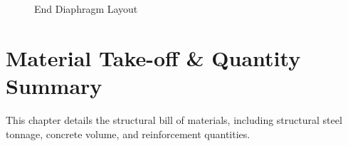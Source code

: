 \documentclass[12pt,a4paper]{report}
\numberwithin{table}{chapter}
\numberwithin{figure}{chapter}
\begin{document}
\begin{figure}[H]
\centering
{}
\caption{End Diaphragm Layout}
\label{fig:ed-layout}
\end{figure}


\noindent
\begin{minipage}[t]{0.31\textwidth}
\centering
{}
\label{fig:ed-bracing-sec}
\end{minipage}
\hfill
\begin{minipage}[t]{0.31\textwidth}
\centering
{}
\label{fig:ed-top-chord}
\end{minipage}
\hfill
\begin{minipage}[t]{0.31\textwidth}
\centering
{}
\label{fig:ed-bottom-chord}
\end{minipage}



\chapter{Material Take-off \& Quantity Summary}
\label{ch:material-takeoff}

This chapter details the structural bill of materials, including structural steel tonnage, concrete volume, and reinforcement quantities.
\end{document}
